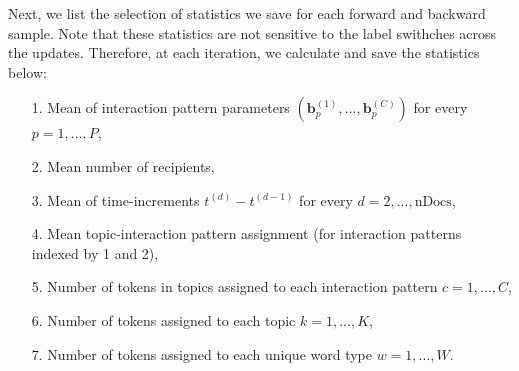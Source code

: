 \documentclass[a4paper]{article}
\begin{document}
   Next, we list the selection of statistics we save for each forward and backward sample. Note that these statistics are not sensitive to the label swithches across the updates. Therefore, at each iteration, we calculate and save the statistics below:
      \begin{itemize}
      	\item[1.] Mean of interaction pattern parameters $(\boldsymbol{b}_p^{(1)},...,\boldsymbol{b}_p^{(C)})$ for every $p = 1,...,P$,
      	\item[2.] Mean number of recipients,
      	\item[3.] Mean of time-increments $t^{(d)}-t^{(d-1)}$ for every $d=2,...,\mbox{nDocs}$,
      	\item[4.] Mean topic-interaction pattern assignment (for interaction patterns indexed by 1 and 2), 
      	\item[5.] Number of tokens in topics assigned to each interaction pattern $c=1,...,C$,
      	\item[6.] Number of tokens assigned to each topic $k=1,...,K$, 
       \item[7.] Number of tokens assigned to each unique word type $w=1,...,W$.
      	      \end{itemize}
\end{document}
